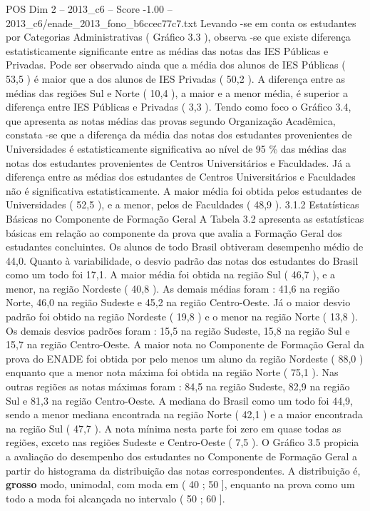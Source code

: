 \begin{textsample}{POS Dim 2 – 2013\_c6 – Score -1.00 – 2013\_c6/enade\_2013\_fono\_b6ccec77c7.txt}
Levando -se em conta os estudantes por Categorias Administrativas ( Gráfico 3.3 ), observa -se que existe diferença estatisticamente significante entre as médias das notas das IES Públicas e Privadas.
Pode ser observado ainda que a média dos alunos de IES Públicas ( 53,5 ) é maior que a dos alunos de IES Privadas ( 50,2 ).
A diferença entre as médias das regiões Sul e Norte ( 10,4 ), a maior e a menor média, é superior a diferença entre IES Públicas e Privadas ( 3,3 ).
Tendo como foco o Gráfico 3.4, que apresenta as notas médias das provas segundo Organização Acadêmica, constata -se que a diferença da média das notas dos estudantes provenientes de Universidades é estatisticamente significativa ao nível de 95 \% das médias das notas dos estudantes provenientes de Centros Universitários e Faculdades.
Já a diferença entre as médias dos estudantes de Centros Universitários e Faculdades não é significativa estatisticamente.
A maior média foi obtida pelos estudantes de Universidades ( 52,5 ), e a menor, pelos de Faculdades ( 48,9 ). 3.1.2 Estatísticas Básicas no Componente de Formação Geral A Tabela 3.2 apresenta as estatísticas básicas em relação ao componente da prova que avalia a Formação Geral dos estudantes concluintes.
Os alunos de todo Brasil obtiveram desempenho médio de 44,0.
Quanto à variabilidade, o desvio padrão das notas dos estudantes do Brasil como um todo foi 17,1.
A maior média foi obtida na região Sul ( 46,7 ), e a menor, na região Nordeste ( 40,8 ).
As demais médias foram : 41,6 na região Norte, 46,0 na região Sudeste e 45,2 na região Centro-Oeste.
Já o maior desvio padrão foi obtido na região Nordeste ( 19,8 ) e o menor na região Norte ( 13,8 ).
Os demais desvios padrões foram : 15,5 na região Sudeste, 15,8 na região Sul e 15,7 na região Centro-Oeste.
A maior nota no Componente de Formação Geral da prova do ENADE foi obtida por pelo menos um aluno da região Nordeste ( 88,0 ) enquanto que a menor nota máxima foi obtida na região Norte ( 75,1 ).
Nas outras regiões as notas máximas foram : 84,5 na região Sudeste, 82,9 na região Sul e 81,3 na região Centro-Oeste.
A mediana do Brasil como um todo foi 44,9, sendo a menor mediana encontrada na região Norte ( 42,1 ) e a maior encontrada na região Sul ( 47,7 ).
A nota mínima nesta parte foi zero em quase todas as regiões, exceto nas regiões Sudeste e Centro-Oeste ( 7,5 ).
O Gráfico 3.5 propicia a avaliação do desempenho dos estudantes no Componente de Formação Geral a partir do histograma da distribuição das notas correspondentes.
A distribuição é, \textbf{grosso} modo, unimodal, com moda em ( 40 ; 50 ], enquanto na prova como um todo a moda foi alcançada no intervalo ( 50 ; 60 ].

\end{textsample}

